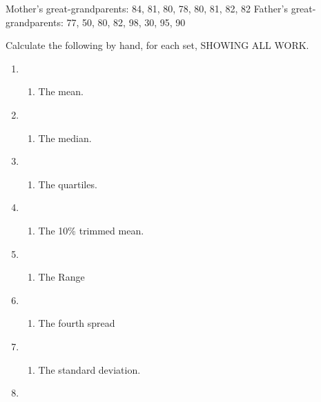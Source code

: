 \documentclass[
  letterpaper,
  DIV=11,
  numbers=noendperiod]{scrartcl}
\providecommand{\tightlist}{%
  \setlength{\itemsep}{0pt}\setlength{\parskip}{0pt}}\usepackage{longtable,booktabs,array}
\begin{document}
Mother's great-grandparents: 84, 81, 80, 78, 80, 81, 82, 82 Father's
great-grandparents: 77, 50, 80, 82, 98, 30, 95, 90

Calculate the following by hand, for each set, SHOWING ALL WORK.

\begin{enumerate}
\def\labelenumi{\alph{enumi}.}
\item
  \begin{enumerate}
  \def\labelenumii{(\arabic{enumii})}
  \setcounter{enumii}{3}
  \tightlist
  \item
    The mean.
  \end{enumerate}
\item
  \begin{enumerate}
  \def\labelenumii{(\arabic{enumii})}
  \setcounter{enumii}{3}
  \tightlist
  \item
    The median.
  \end{enumerate}
\item
  \begin{enumerate}
  \def\labelenumii{(\arabic{enumii})}
  \setcounter{enumii}{3}
  \tightlist
  \item
    The quartiles.
  \end{enumerate}
\item
  \begin{enumerate}
  \def\labelenumii{(\arabic{enumii})}
  \setcounter{enumii}{3}
  \tightlist
  \item
    The 10\% trimmed mean.
  \end{enumerate}
\item
  \begin{enumerate}
  \def\labelenumii{(\arabic{enumii})}
  \setcounter{enumii}{1}
  \tightlist
  \item
    The Range
  \end{enumerate}
\item
  \begin{enumerate}
  \def\labelenumii{(\arabic{enumii})}
  \setcounter{enumii}{1}
  \tightlist
  \item
    The fourth spread
  \end{enumerate}
\item
  \begin{enumerate}
  \def\labelenumii{(\arabic{enumii})}
  \setcounter{enumii}{5}
  \tightlist
  \item
    The standard deviation.
  \end{enumerate}
\item
  \begin{enumerate}

\end{enumerate}
\end{enumerate}
\end{document}

